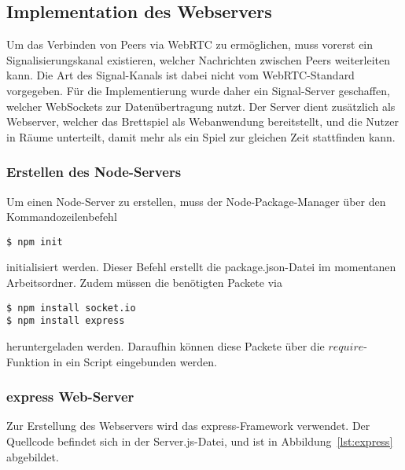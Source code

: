 \subsection{Implementation des Webservers}
Um das Verbinden von Peers via WebRTC zu ermöglichen, muss vorerst ein Signalisierungskanal existieren, welcher Nachrichten zwischen Peers weiterleiten kann. Die Art des Signal-Kanals ist dabei nicht vom WebRTC-Standard vorgegeben. Für die Implementierung wurde daher ein Signal-Server geschaffen, welcher WebSockets zur Datenübertragung nutzt. Der Server dient zusätzlich als Webserver, welcher das Brettspiel als Webanwendung bereitstellt, und die Nutzer in \glqq{}Räume\grqq{} unterteilt, damit mehr als ein Spiel zur gleichen Zeit stattfinden kann.\par

\subsubsection{Erstellen des Node-Servers}
Um einen Node-Server zu erstellen, muss der Node-Package-Manager über den Kommandozeilenbefehl

\lstset{style=STYLE_COMMAND_LINE_ARGUMENT_SINGLE_LINE}
\begin{lstlisting}[belowskip=-0.8 \baselineskip]
$ npm init
\end{lstlisting}

initialisiert werden. Dieser Befehl erstellt die \glqq{}package.json\grqq{}-Datei im momentanen Arbeitsordner. Zudem müssen die benötigten Packete via

\lstset{style=STYLE_COMMAND_LINE_ARGUMENT_SINGLE_LINE}
\begin{lstlisting}[belowskip=-0.8 \baselineskip]
$ npm install socket.io
$ npm install express
\end{lstlisting}

heruntergeladen werden. Daraufhin können diese Packete über die $require$-Funktion in ein Script eingebunden werden.

\subsubsection{express Web-Server}
Zur Erstellung des Webservers wird das \glqq{}express\grqq{}-Framework verwendet. Der Quellcode befindet sich in der \glqq{}Server.js\grqq{}-Datei, und ist in Abbildung~\ref{lst:express} abgebildet.

